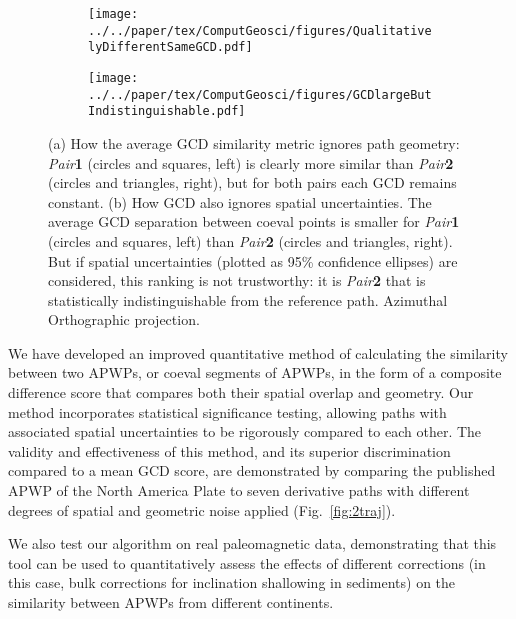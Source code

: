 \begin{figure*}[tbp]
  \captionsetup[subfigure]{labelformat=empty,aboveskip=-6pt,belowskip=-6pt}
  \centering
  \begin{subfigure}[htbp]{1.01\textwidth}
    \centering
    \texttt{[image: ../../paper/tex/ComputGeosci/figures/QualitativelyDifferentSameGCD.pdf]}
    \caption{}\label{fig:QualitativelyDifferentSameGCD}
  \end{subfigure}
  \begin{subfigure}[htbp]{1.01\textwidth}
    \centering
    \texttt{[image: ../../paper/tex/ComputGeosci/figures/GCDlargeButIndistinguishable.pdf]}
    \caption{}\label{fig:GCDlargeButIndistinguishable}
  \end{subfigure}
  \caption[Examples showing GCD is a bad index of similarity]{(a) How the
  average GCD similarity metric ignores path geometry: \emph{Pair}\textbf{1}
  (circles and squares, left) is clearly more similar than \emph{Pair}\textbf{2}
  (circles and triangles, right), but for both pairs each GCD remains constant.
  (b) How GCD also ignores spatial uncertainties. The average GCD separation
  between coeval points is smaller for \emph{Pair}\textbf{1} (circles and
  squares, left) than \emph{Pair}\textbf{2} (circles and triangles, right). But
  if spatial uncertainties (plotted as 95\% confidence ellipses) are considered,
  this ranking is not trustworthy: it is \emph{Pair}\textbf{2} that is
  statistically indistinguishable from the reference path. Azimuthal
  Orthographic projection.}\label{fig:GCDbadIndex}
\end{figure*}

We have developed an improved quantitative method of calculating the similarity
between two APWPs, or coeval segments of APWPs, in the form of a composite
difference score that compares both their spatial overlap and geometry. Our
method incorporates statistical significance testing, allowing paths with
associated spatial uncertainties to be rigorously compared to each other. The
validity and effectiveness of this method, and its superior discrimination
compared to a mean GCD score, are demonstrated by comparing the published APWP
of the North America Plate to seven derivative paths with different degrees of
spatial and geometric noise applied (Fig.~\ref{fig:2traj}).

We also test our algorithm on real paleomagnetic data, demonstrating that this
tool can be used to quantitatively assess the effects of different corrections
(in this case, bulk corrections for inclination shallowing in sediments) on the
similarity between APWPs from different continents.

